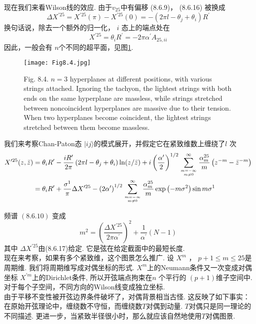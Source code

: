 现在我们来看Wilson线的效应. 由于$v_{25}$中有偏移 (8.6.9)， (8.6.16) 被换成
\begin{equation}
	\Delta X^{\prime 25}=X^{\prime 25}(\pi)-X^{\prime 25}(0)=-\left(2 \pi l-\theta_{j}+\theta_{i}\right) R^{\prime}
\end{equation}
换句话说，除去一个额外的归一化， $i$ 态上的端点处在
\begin{equation}
	X^{\prime 25}=\theta_{i} R^{\prime}=-2 \pi \alpha^{\prime} A_{25, i i}
\end{equation}
因此，一般会有 $n$个不同的超平面，见图\ref{Fig8.4}.

\begin{figure}
	\begin{center}
		\texttt{[image: Fig8.4.jpg]}\\
		\caption{Fig. 8.4. $n=3$ hyperplanes at different positions, with various strings attached. Ignoring the tachyon, the lightest strings with both ends on the same hyperplane are massless, while strings stretched between noncoincident hyperplanes are massive due to their tension. When two hyperplanes become coincident, the lightest strings stretched between them become massless.}\label{Fig8.4}
	\end{center}
\end{figure}

我们来考察Chan-Paton态 $|i j\rangle$的模式展开，并假定它在紧致维数上缠绕了$l$ 次
\begin{equation}
	\begin{aligned}
		X^{\prime 25}(z, \bar{z}) &=\theta_{i} R^{\prime}-\frac{i R^{\prime}}{2 \pi}\left(2 \pi l-\theta_{j}+\theta_{i}\right) \ln (z / \bar{z})+i\left(\frac{\alpha^{\prime}}{2}\right)^{1 / 2} \sum_{m=-\infty \atop m \neq 0}^{\infty} \frac{\alpha_{m}^{25}}{m}\left(z^{-m}-\bar{z}^{-m}\right) \\
		&=\theta_{i} R^{\prime}+\frac{\sigma^{1}}{\pi} \Delta X^{\prime 25}-\left(2 \alpha^{\prime}\right)^{1 / 2} \sum_{m=-\infty \atop m \neq 0}^{\infty} \frac{\alpha_{m}^{25}}{m} \exp \left(-m \sigma^{2}\right) \sin m \sigma^{1}
	\end{aligned}
\end{equation}

频谱 $(8.6 .10)$ 变成
\begin{equation}
	m^{2}=\left(\frac{\Delta X^{\prime 25}}{2 \pi \alpha^{\prime}}\right)^{2}+\frac{1}{\alpha^{\prime}}(N-1)
\end{equation}
其中 $\Delta X^{\prime 25}$由(8.6.17)给定. 它是弦在给定截面中的最短长度.\\
现在来考察，如果有多个紧致维，这个图景怎么推广. 设 $X^{m}$ ， $p+1 \leq m \leq 25$是周期维. 我们将周期维写成对偶坐标的形式. $X^{m}$上的Neumann条件又一次变成对偶坐标 $X^{\prime m}$上的Dirichlet条件, 所以开弦端点拘束在$n$ 个平行的 $(p+1)$维子空间中. 对于每个子空间，不同方向的Wilson线变成独立坐标.\\
由于平移不变性被开弦边界条件破坏了，对偶背景相当古怪. 这反映了如下事实：在原始开弦理论中，缠绕数不守恒，而缠绕数$T$对偶到动量. $T$对偶只是同一理论的不同描述. 更进一步，当紧致半径很小时，那么就应该自然地使用$T$对偶图景.

